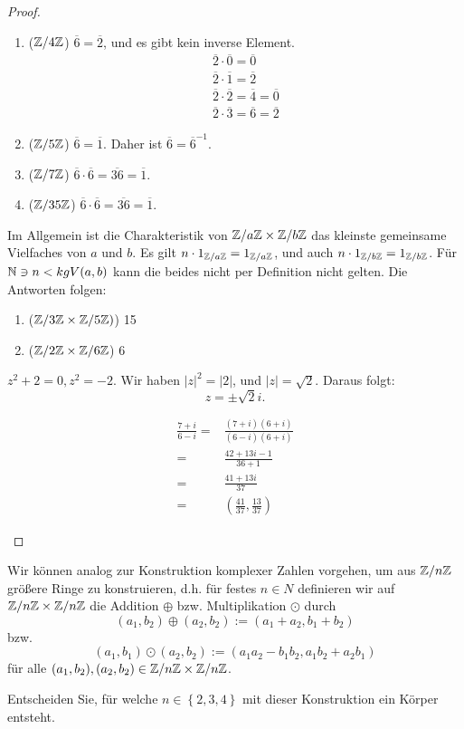 \begin{proof}
	\begin{parts}
	\item 
		\begin{enumerate}[label=(\roman*)]
			\item ($\mathbb{Z} / 4\mathbb{Z}$) $\overline{6}=\overline{2}$, und es gibt kein inverse Element.
				\begin{gather*}
					\overline{2}\cdot \overline{0}=\overline{0}\\
					\overline{2}\cdot \overline{1}=\overline{2}\\
					\overline{2}\cdot \overline{2}=\overline{4}=\overline{0}\\
					\overline{2}\cdot \overline{3}=\overline{6}=\overline{2}
				\end{gather*}
			\item ($\mathbb{Z} / 5\mathbb{Z}$) $\overline{6}=\overline{1}$. Daher ist $\overline{6}=\overline{6}^{-1}$.
			\item ($\mathbb{Z} / 7\mathbb{Z}$) $\overline{6}\cdot \overline{6}=\overline{36}=\overline{1}$.
			\item ($\mathbb{Z} / 35 \mathbb{Z}$) $\overline{6}\cdot \overline{6}=\overline{36}=\overline{1}$.
		\end{enumerate}
	\item Im Allgemein ist die Charakteristik von $\mathbb{Z} / a\mathbb{Z}\times \mathbb{Z} / b\mathbb{Z}$ das kleinste gemeinsame Vielfaches von $a$ und $b$. Es gilt $n\cdot 1_{\mathbb{Z} / a\mathbb{Z}}=1_{\mathbb{Z} / a \mathbb{Z}}$, und auch $n \cdot 1_{\mathbb{Z} / b\mathbb{Z}}=1_{\mathbb{Z} / b \mathbb{Z}}$. F\"{u}r $\mathbb{N} \ni n < kgV(a,b)$ kann die beides nicht per Definition nicht gelten. Die Antworten folgen: 
		\begin{enumerate}[label=(\roman*)]
			\item ($\mathbb{Z} / 3\mathbb{Z} \times \mathbb{Z} / 5\mathbb{Z})$) 15
			\item ($\mathbb{Z} / 2\mathbb{Z} \times \mathbb{Z} / 6\mathbb{Z}$) 6
		\end{enumerate}
	\item $z^2+2=0, z^2=-2$. Wir haben $|z|^2=|2|$, und $|z|=\sqrt{2} $. Daraus folgt:
		\[
			z=\pm\sqrt{2}i
		.\] 
	\item 
		\begin{align*}
			\frac{7+i}{6-i}=&\frac{(7+i)(6+i)}{(6-i)(6+i)}\\
			=& \frac{42+13i-1}{36+1}\\
			=& \frac{41+13i}{37}\\
			=&\left( \frac{41}{37},\frac{13}{37} \right) 
		\end{align*}
	\end{parts}
\end{proof}
\begin{Problem}
	Wir können analog zur Konstruktion komplexer Zahlen vorgehen, um aus $\mathbb{Z} / n\mathbb{Z}$ größere Ringe zu konstruieren, d.h. für festes  $n\in N$ definieren wir auf $\mathbb{Z} / n \mathbb{Z}\times \mathbb{Z} / n \mathbb{Z}$ die Addition $\oplus$ bzw. Multiplikation $\odot$ durch
	\[
		(a_1,b_2)\oplus (a_2,b_2):=(a_1+a_2,b_1+b_2)
	\]
	bzw.
	\[
		(a_1,b_1)\odot (a_2,b_2):=(a_1a_2-b_1b_2,a_1b_2+a_2b_1)
	\]
	f\"{u}r alle $(a_1,b_2),(a_2,b_2)\in \mathbb{Z} / n \mathbb{Z} \times \mathbb{Z} / n \mathbb{Z}$. 

Entscheiden Sie, für welche $n\in \left\{ 2,3,4 \right\} $ mit dieser Konstruktion ein Körper entsteht. 
\end{Problem}
